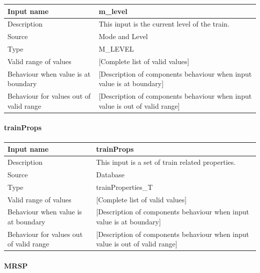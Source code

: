 \begin{longtable}{p{}p{}}
\toprule
Input name				& m\_level \\
\midrule
Description				& This input is the current level of the train. \\
\midrule
Source					& Mode and Level \\ 
\midrule
Type					& M\_LEVEL \\
\midrule
Valid range of values	& [Complete list of valid values] \\
\midrule
Behaviour when value is at boundary	& [Description of components behaviour when input value is at boundary] \\
\midrule
Behaviour for values out of valid range	& [Description of components behaviour when input value is out of valid range] \\
\bottomrule
\end{longtable}


\paragraph{trainProps}

\begin{longtable}{p{}p{}}
\toprule
Input name				& trainProps \\
\midrule
Description				& This input is a set of train related properties. \\
\midrule
Source					& Database \\ 
\midrule
Type					& trainProperties\_T \\
\midrule
Valid range of values	& [Complete list of valid values] \\
\midrule
Behaviour when value is at boundary	& [Description of components behaviour when input value is at boundary] \\
\midrule
Behaviour for values out of valid range	& [Description of components behaviour when input value is out of valid range] \\
\bottomrule
\end{longtable}


\paragraph{MRSP}

